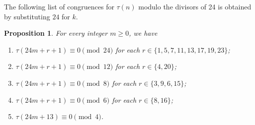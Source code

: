 \documentclass[10pt]{article}
\newtheorem{proposition}[theorem]{Proposition}
\theoremstyle{definition}
\begin{document}
The following list of congruences for $\tau(n)$ modulo the divisors of 24 is obtained by substituting $24$ for $k$.
\begin{proposition}
For every integer $m\geq 0$, we have
\begin{enumerate}
\item $\tau(24m+r+1)\equiv 0\pmod {24}$ for each $r\in\{1,5,7,11,13,17,19,23\}$;
\item $\tau(24m+r+1)\equiv 0\pmod{12}$ for each $r\in\{4,20\}$;
\item $\tau(24m+r+1)\equiv 0\pmod{8}$ for each $r\in\{3,9,6,15\}$;
\item $\tau(24m+r+1)\equiv 0\pmod{6}$ for each $r\in\{8,16\}$;
\item $\tau(24m+13)\equiv 0\pmod{4}$.
\end{enumerate}
\end{proposition}
\end{document}
